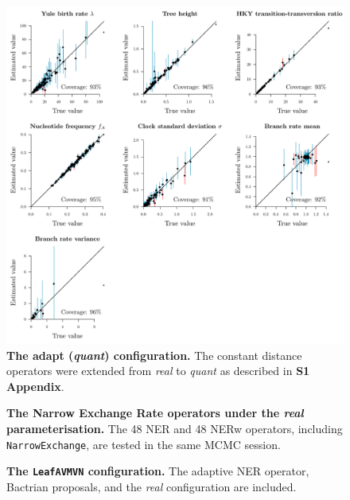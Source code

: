\documentclass[12pt]{article}
\begin{document}
\begin{figure}[!htb]
\includegraphics[width=\textwidth]{Figures/N30_quant_cached_adaptive.pdf}
\caption{\textbf{The adapt (\textit{quant}) configuration.} The constant distance operators were extended from \emph{real} to \emph{quant} as described in \textbf{S1 Appendix}.}
\end{figure}






\begin{figure}[!htb]
\caption{\textbf{The Narrow Exchange Rate operators under the \textit{real} parameterisation.} The 48 NER and 48 NERw operators, including \texttt{NarrowExchange}, are tested in the same MCMC session.}
\end{figure}



\begin{figure}[!htb]
\caption{\textbf{The \texttt{LeafAVMVN} configuration.} The adaptive NER operator, Bactrian proposals, and the \emph{real} configuration are included.}
\end{figure}





%
\end{document}
